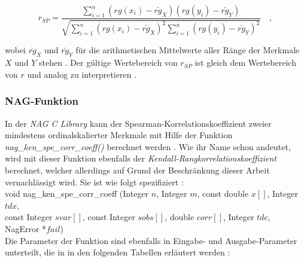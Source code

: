 \begin{equation*}
    r_{SP}=\dfrac{\sum_{i=1}^{n}{(rg(x_i)-\bar{rg}_X)(rg(y_i)-\bar{rg}_Y)}}{\sqrt{\sum_{i=1}^{n}{(rg(x_i)-\bar{rg}_X)^2\sum_{i=1}^{n}{(rg(y_i)-\bar{rg}_Y)^2}}}} \quad ,
\end{equation*}

\noindent wobei $\bar{rg}_X$ und $\bar{rg}_Y$ für die arithmetischen Mittelwerte aller Ränge der Merkmale $X$ und $Y$ stehen \cite[S. 142-143]{Fahrmeir2010}. Der gültige Wertebereich von $r_{SP}$ ist gleich dem Wertebereich von $r$ und analog zu interpretieren \cite[S. 143]{Fahrmeir2010}.

\subsubsection{NAG-Funktion}
\label{sec:spear_rangkorr_funk}

In der {\it NAG C Library} kann der Spearman-Korrelationskoeffizient zweier mindestens ordinalskalierter Merkmale mit Hilfe der Funktion {\it nag\_ken\_spe\_corr\_coeff()} berechnet werden \cite{nag:g02brc}. Wie ihr Name schon andeutet, wird mit dieser Funktion ebenfalls der {\it Kendall-Rangkorrelationskoeffizient} berechnet, welcher allerdings auf Grund der Beschränkung dieser Arbeit vernachlässigt wird. Sie ist wie folgt spezifiziert \cite[S. 1]{nag:g02brc}:\\

\noindent void nag\_ken\_spe\_corr\_coeff (Integer $n$, Integer $m$, const double $x[]$, Integer $tdx$,\\
\hspace*{5mm} const Integer $svar[]$, const Integer $sobs[]$, double $corr[]$, Integer $tdc$,\\
\hspace*{5mm} NagError *$fail$)\\

\noindent Die Parameter der Funktion sind ebenfalls in Eingabe- und Ausgabe-Parameter unterteilt, die in in den folgenden Tabellen erläutert werden \cite[S. 2-3]{nag:g02brc}:\\

\\

